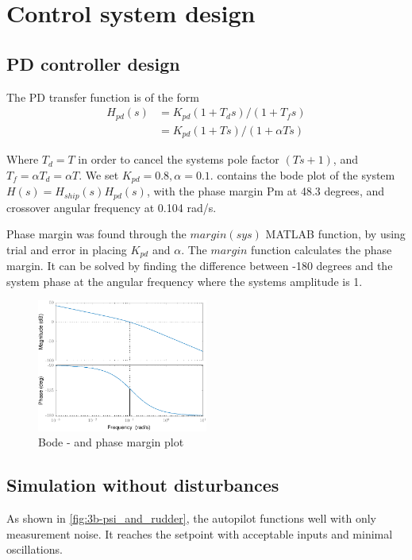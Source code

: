 \section{Control system design}
\subsection{PD controller design}

The PD transfer function is of the form
\begin{align*}
    H_{pd}(s) &= K_{pd}(1+T_d s)/(1+T_f s) \\
              &= K_{pd}(1+T s)/(1+\alpha T s)
\end{align*}

Where $T_d = T$ in order to cancel the systems pole factor $(Ts + 1)$, and $T_f = \alpha T_d = \alpha T$. We set $K_{pd} = 0.8, \alpha = 0.1$.  contains the bode plot of the system $H(s) = H_{ship}(s)H_{pd}(s)$, with the phase margin Pm at 48.3 degrees, and crossover angular frequency at 0.104 rad/s.

Phase margin was found through the $margin(sys)$ MATLAB function, by using trial and error in placing $K_{pd}$ and $\alpha$. The $margin$ function calculates the phase margin.  It can be solved by finding the difference between -180 degrees and the system phase at the angular frequency where the systems amplitude is 1.

\begin{figure}[ht!]
    \centering
    \includegraphics[width=0.5\textwidth]{images/3a-bode_and_phasemargin}
    \caption{Bode - and phase margin plot}
    \label{fig:3a-bode_and_phasemargin}
\end{figure}

\subsection{Simulation without disturbances}
As shown in \cref{fig:3b-psi_and_rudder}, the autopilot functions well with only measurement noise.  It reaches the setpoint with acceptable inputs and minimal oscillations.

